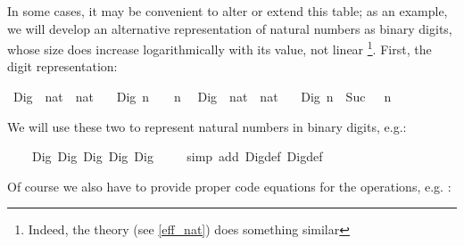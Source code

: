 \begin{isabellebody}
\begin{isamarkuptext}
  In some cases, it may be convenient to alter or
  extend this table;  as an example, we will develop an alternative
  representation of natural numbers as binary digits, whose
  size does increase logarithmically with its value, not linear
  \footnote{Indeed, the \hyperlink{theory.Efficient-Nat}{\mbox{}} theory (see \ref{eff_nat})
    does something similar}.  First, the digit representation:%
\end{isamarkuptext}%
\isamarkuptrue%
%
\isadelimquote
%
\endisadelimquote
%
\isatagquote
{}\isamarkupfalse%
\ Dig{}\ {\isacharcolon}{\isacharcolon}\ {\isachardoublequoteopen}nat\ {\isasymRightarrow}\ nat{\isachardoublequoteclose}\ \isanewline
\ \ {\isachardoublequoteopen}Dig{}\ n\ {\isacharequal}\ {}\ {\isacharasterisk}\ n{\isachardoublequoteclose}\isanewline
\isanewline
{}\isamarkupfalse%
\ \ Dig{}\ {\isacharcolon}{\isacharcolon}\ {\isachardoublequoteopen}nat\ {\isasymRightarrow}\ nat{\isachardoublequoteclose}\ \isanewline
\ \ {\isachardoublequoteopen}Dig{}\ n\ {\isacharequal}\ Suc\ {\isacharparenleft}{}\ {\isacharasterisk}\ n{\isacharparenright}{\isachardoublequoteclose}%
\endisatagquote
{\isafoldquote}%
%
\isadelimquote
%
\endisadelimquote
%
\begin{isamarkuptext}%
\noindent We will use these two  to represent natural numbers
  in binary digits, e.g.:%
\end{isamarkuptext}%
\isamarkuptrue%
%
\isadelimquote
%
\endisadelimquote
%
\isatagquote
{}\isamarkupfalse%
\ {}{}{\isacharcolon}\ {\isachardoublequoteopen}{}{}\ {\isacharequal}\ Dig{}\ {\isacharparenleft}Dig{}\ {\isacharparenleft}Dig{}\ {\isacharparenleft}Dig{}\ {\isacharparenleft}Dig{}\ {}{\isacharparenright}{\isacharparenright}{\isacharparenright}{\isacharparenright}{\isachardoublequoteclose}\isanewline
\ \ \isamarkupfalse%
\ {\isacharparenleft}simp\ add{\isacharcolon}\ Dig{}{\isacharunderscore}def\ Dig{}{\isacharunderscore}def{\isacharparenright}%
\endisatagquote
{\isafoldquote}%
%
\isadelimquote
%
\endisadelimquote
%
\begin{isamarkuptext}%
\noindent Of course we also have to provide proper code equations for
  the operations, e.g. :%
\end{isamarkuptext}%

\end{isabellebody}
